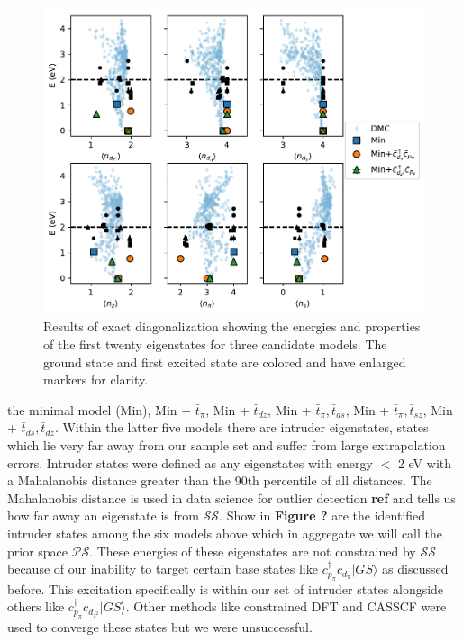\documentclass{article}
\begin{document}
\begin{figure}[H]
\centering
\includegraphics[width=0.7\linewidth]{../qwalk/old/ub3lyp_s1_/analysis/figs/init_ed.pdf}
\caption{Results of exact diagonalization showing the energies and properties of the first twenty eigenstates for three candidate models. The ground state and first excited state are colored and have enlarged markers for clarity.}
\label{fig:Intruder}
\end{figure}
\pagebreak



the minimal model (Min), Min + $\bar{t}_\pi$, Min + $\bar{t}_{dz}$, Min + $\bar{t}_\pi, \bar{t}_{ds}$, Min + $\bar{t}_\pi, \bar{t}_{sz}$, Min + $\bar{t}_{ds}, \bar{t}_{dz}$. Within the latter five models there are intruder eigenstates, states which lie very far away from our sample set and suffer from large extrapolation errors. Intruder states were defined as any eigenstates with energy $< $ 2 eV with a Mahalanobis distance greater than the 90th percentile of all distances. The Mahalanobis distance is used in data science for outlier detection \textbf{ref} and tells us how far away an eigenstate is from $\mathcal{SS}$. Show in \textbf{Figure ?} are the identified intruder states among the six models above which in aggregate we will call the prior space $\mathcal{PS}$. These energies of these eigenstates are not constrained by $\mathcal{SS}$ because of our inability to target certain base states like $c^\dagger_{p_\pi} c_{d_\pi} |GS\rangle$ as discussed before. This excitation specifically is within our set of intruder states alongside others like $c^\dagger_{p_\pi} c_{d_{z^2}} |GS\rangle$.
Other methods like constrained DFT and CASSCF were used to converge these states but we were unsuccessful. 
\end{document}
